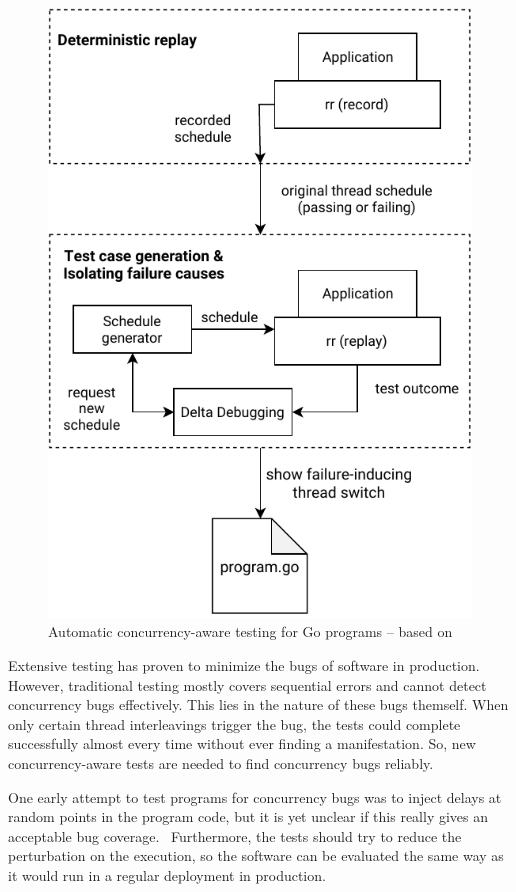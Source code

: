 \documentclass[conference]{IEEEtran}
\begin{document}
\begin{figure}
    \includegraphics[width=\linewidth]{figures/Concurrency-Testing.pdf}
    \caption{Automatic concurrency-aware testing for Go programs -- based on\cite{acm2002}}
    \label{fig:testing}
\end{figure}

Extensive testing has proven to minimize the bugs of software in production.\cite{makinen2014testing}
However, traditional testing mostly covers sequential errors and cannot detect concurrency bugs effectively.\cite{lu2008mistakes}
This lies in the nature of these bugs themself.
When only certain thread interleavings trigger the bug, the tests could complete successfully almost every time without ever finding a manifestation.
So, new concurrency-aware tests are needed to find concurrency bugs reliably.

One early attempt to test programs for concurrency bugs was to inject delays at random points in the program code, but it is yet unclear if this really gives an acceptable bug coverage.~\cite{lu2008mistakes}
Furthermore, the tests should try to reduce the perturbation on the execution, so the software can be evaluated the same way as it would run in a regular deployment in production.
\end{document}
